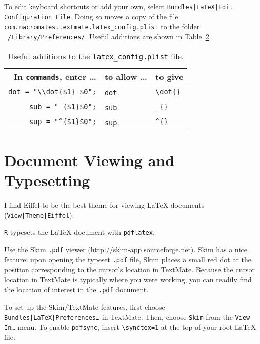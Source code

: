 \documentclass[10pt]{article}
\begin{document}
\begin{table}
\begin{tabular}{r|l|l}
\end{tabular}
\label{tab:keyboard_shortcuts}
\end{table}

To edit keyboard shortcuts or add your own, select
\texttt{Bundles|LaTeX|Edit Configuration File}. 
Doing so moves a copy of the file 
\verb!com.macromates.textmate.latex_config.plist!
to the folder
\texttt{~/Library/Preferences/}.
Useful additions are shown in Table~\ref{tab:additions_to_plist}.

\begin{table}
\centering
\caption{Useful additions to the \texttt{latex\_config.plist} file.}
\begin{tabular}{r|l|l}
	In \texttt{commands}, enter \dots & to allow \dots      & to give                  \\
	\hline
	\verb!dot = "\\dot{$1} $0";!   & \texttt{dot}\cmdkey\shiftkey. & \verb!\dot{}!     \\
	\verb!sub = "_{$1}$0";!        & \texttt{sub}\cmdkey\shiftkey. & \verb!_{}!        \\
	\verb!sup = "^{$1}$0";!        & \texttt{sup}\cmdkey\shiftkey. & \verb!^{}!        \\
\end{tabular}
\label{tab:additions_to_plist}
\end{table}



\section{Document Viewing and Typesetting} %
\label{sec:document_viewing_and_typesetting}
I find Eiffel to be the best theme for viewing \LaTeX{} documents
(\texttt{View|Theme|Eiffel}). 

\cmdkey\texttt{R} typesets the \LaTeX{} document with \texttt{pdflatex}. 

Use the Skim \texttt{.pdf} viewer (\url{http://skim-app.sourceforge.net}).
Skim has a nice feature: upon opening the typeset \texttt{.pdf} file,
Skim places a small red dot at the position corresponding to the cursor's 
location in TextMate. 
Because the cursor location in TextMate is typically where you were working,
you can readily find the location of interest in the \texttt{.pdf} document.

To set up the Skim/TextMate features, 
first choose \texttt{Bundles|LaTeX|Preferences\dots} in TextMate.
Then, choose \texttt{Skim} from the \texttt{View In\dots} menu.
To enable \texttt{pdfsync}, insert \verb!\synctex=1! 
at the top of your root \LaTeX{} file.
\end{document}
